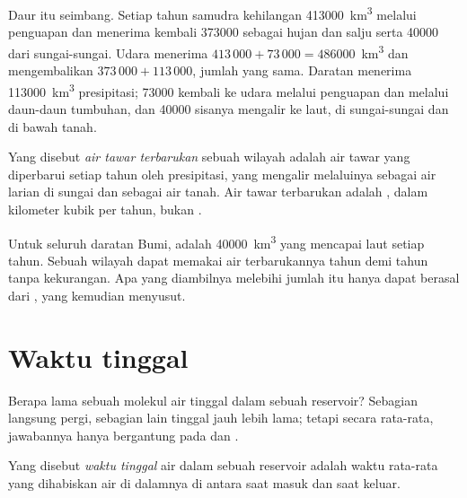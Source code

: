 Daur itu seimbang. Setiap tahun samudra kehilangan \num{413000}~\unit{km^3}
melalui penguapan dan menerima kembali \num{373000} sebagai hujan dan salju
serta \num{40000} dari sungai-sungai. Udara menerima
$413\,000 + 73\,000 = \num{486000}$~\unit{km^3} dan mengembalikan
$373\,000 + 113\,000$, jumlah yang sama. Daratan menerima
\num{113000}~\unit{km^3} presipitasi; \num{73000} kembali ke udara melalui
penguapan dan melalui daun-daun tumbuhan, dan \num{40000} sisanya mengalir ke
laut, di sungai-sungai dan di bawah tanah.

\begin{definition}\label{def:g10:freshwater-resources:renewable}
Yang disebut \emph{air tawar terbarukan} sebuah
wilayah adalah  air tawar yang diperbarui setiap tahun oleh presipitasi,
yang mengalir melaluinya sebagai air larian di sungai dan sebagai air tanah.
Air tawar terbarukan adalah , dalam kilometer kubik per tahun, bukan
.
\end{definition}

Untuk seluruh daratan Bumi,  adalah \num{40000}~\unit{km^3}
yang mencapai laut setiap tahun. Sebuah wilayah dapat memakai air
terbarukannya tahun demi tahun tanpa kekurangan. Apa yang diambilnya melebihi
jumlah itu hanya dapat berasal dari , yang kemudian menyusut.

\section{Waktu tinggal}

Berapa lama sebuah molekul air tinggal dalam sebuah reservoir? Sebagian
langsung pergi, sebagian lain tinggal jauh lebih lama; tetapi secara
rata-rata, jawabannya hanya bergantung pada  dan .

\begin{definition}\label{def:g10:freshwater-resources:residence-time}
Yang disebut \emph{waktu tinggal} air dalam sebuah
reservoir adalah waktu rata-rata yang dihabiskan air di dalamnya di antara saat
masuk dan saat keluar.
\end{definition}

